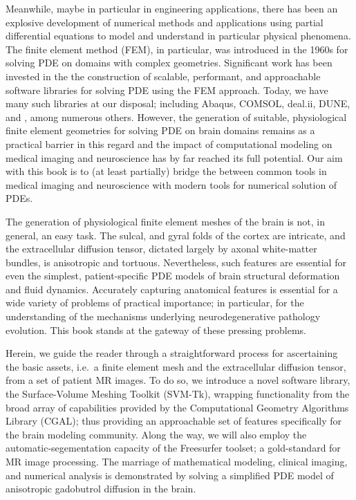 Meanwhile, maybe in particular in engineering applications, there
has been an explosive development of numerical methods and applications
using partial differential equations to model and understand in particular
physical phenomena.  The finite 
element method (FEM), in particular, was introduced in the 1960s for solving 
PDE on domains with complex geometries.  Significant work has been invested in 
the the construction of scalable, performant, and approachable software libraries 
for solving PDE using the FEM approach.  Today, we have many such libraries at 
our disposal; including Abaqus, COMSOL, deal.ii, DUNE, and {\fenics}, among numerous 
others. However, the generation of suitable, physiological finite element 
geometries for solving PDE on brain domains remains as a practical barrier in 
this regard and the impact of computational modeling on medical imaging 
and neuroscience has by far reached its full potential. 
Our aim with this book is to (at least partially) bridge the between
common tools in medical imaging and neuroscience with modern tools for numerical
solution of PDEs. 

The generation of physiological finite element meshes of the brain is not, in 
general, an easy task.  The sulcal, and gyral folds of the cortex are intricate, 
and the extracellular diffusion tensor, dictated largely by axonal white-matter 
bundles, is anisotropic and tortuous. Nevertheless, such features are 
essential for even the simplest, patient-specific PDE models of brain 
structural deformation and fluid dynamics.  Accurately capturing anatomical 
features is essential for a wide variety of problems of practical importance; 
in particular, for the understanding of the mechanisms underlying neurodegenerative 
pathology evolution.  This book stands at the gateway of these pressing problems.  


Herein, we guide the reader through a straightforward process for ascertaining 
the basic assets, i.e.~a finite element mesh and the extracellular diffusion 
tensor, from a set of patient MR images.  To do so, we introduce a novel software library, the 
Surface-Volume Meshing Toolkit (SVM-Tk), wrapping functionality from the broad 
array of capabilities provided by the Computational Geometry Algorithms Library 
(CGAL); thus providing an approachable set of features specifically for 
the brain modeling community.  Along the way, we will also employ the 
automatic-segementation capacity of the Freesurfer toolset; a gold-standard 
for MR image processing.  The marriage of mathematical modeling, clinical imaging, 
and numerical analysis is demonstrated by solving a simplified PDE model of 
anisotropic gadobutrol diffusion in the brain. 


